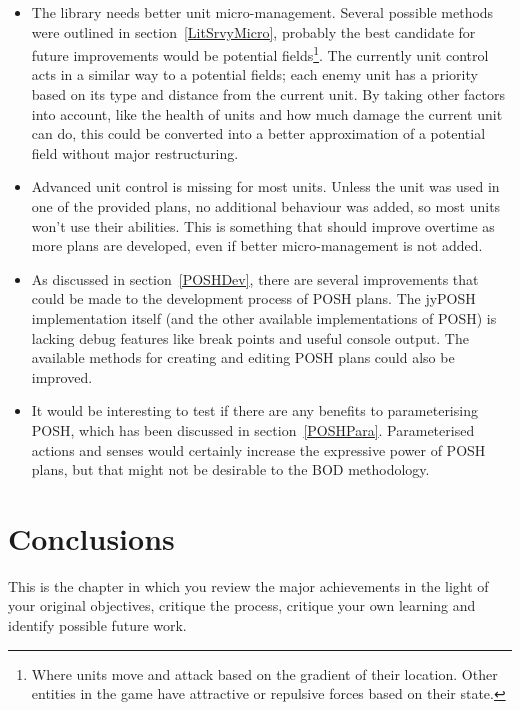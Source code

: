 \documentclass[11pt,openright,a4paper]{report}
\begin{document}
\begin{itemize}
\item{The library needs better unit micro-management. Several possible methods were outlined in section~\ref{LitSrvyMicro}, probably the best candidate for future improvements would be potential fields\footnote{Where units move and attack based on the gradient of their location. Other entities in the game have attractive or repulsive forces based on their state.}. The currently unit control acts in a similar way to a potential fields; each enemy unit has a priority based on its type and distance from the current unit. By taking other factors into account, like the health of units and how much damage the current unit can do, this could be converted into a better approximation of a potential field without major restructuring.}
\item{Advanced unit control is missing for most units. Unless the unit was used in one of the provided plans, no additional behaviour was added, so most units won't use their abilities. This is something that should improve overtime as more plans are developed, even if better micro-management is not added.}
\item{As discussed in section~\ref{POSHDev}, there are several improvements that could be made to the development process of POSH plans. The jyPOSH implementation itself (and the other available implementations of POSH) is lacking debug features like break points and useful console output. The available methods for creating and editing POSH plans could also be improved.}
\item{It would be interesting to test if there are any benefits to parameterising POSH, which has been discussed in section~\ref{POSHPara}. Parameterised actions and senses would certainly increase the expressive power of POSH plans, but that might not be desirable to the BOD methodology.}
\end{itemize}










\chapter{Conclusions}
%

This is the chapter in which you review the major achievements in the
light of your original objectives, critique the process, critique your
own learning and identify possible future work.
\end{document}
